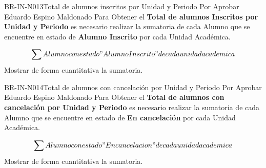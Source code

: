 \begin{BusinessRule}{BR-IN-N013}{Total de alumnos inscritos por Unidad y Periodo}
	{\bcCondition}    %
	{\btTimer}     %
	{\blControlling}    %
	\BRItem[Estado] Por Aprobar
	 Eduardo Espino Maldonado
	\BRItem[Descripción]  Para Obtener el \textbf{Total de alumnos Inscritos por Unidad y Periodo} es necesario realizar la sumatoria de cada Alumno que se encuentre en estado de \textbf{Alumno Inscrito} por cada Unidad Académica.
	\BRItem[Sentencia] \cdtEmpty
	
	$$ \sum  {Alumno con estado "Alumno Inscrito" de cada unidad academica }$$ 
	\BRItem[Motivación] Mostrar de forma cuantitativa la sumatoria.
\end{BusinessRule}

\begin{BusinessRule}{BR-IN-N014}{Total de alumnos con cancelación por Unidad y Periodo}
	{\bcCondition}    %
	{\btTimer}     %
	{\blControlling}    %
	\BRItem[Estado] Por Aprobar
	 Eduardo Espino Maldonado
	\BRItem[Descripción]  Para Obtener el \textbf{Total de alumnos con cancelación por Unidad y Periodo} es necesario realizar la sumatoria de cada Alumno que se encuentre en estado de \textbf{ En cancelación} por cada Unidad Académica.
	\BRItem[Sentencia] \cdtEmpty
	
	$$ \sum  {Alumno con estado "En cancelacion" de cada unidad academica }$$ 
	\BRItem[Motivación] Mostrar de forma cuantitativa la sumatoria.
\end{BusinessRule}



